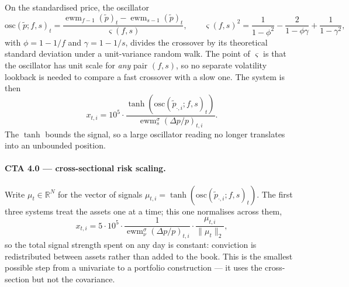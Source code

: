 \documentclass[11pt,a4paper]{article}
\DeclareMathOperator{\ewm}{ewm}
\begin{document}
On the standardised price, the oscillator
\begin{equation}
  \mathrm{osc}(\tilde p; f, s)_t =
  \frac{\ewm_{f-1}(\tilde p)_t - \ewm_{s-1}(\tilde p)_t}{\varsigma(f,s)},
  \qquad
  \varsigma(f,s)^2 = \frac{1}{1-\phi^2} - \frac{2}{1-\phi\gamma} + \frac{1}{1-\gamma^2},
  \label{eq:osc}
\end{equation}
with $\phi = 1 - 1/f$ and $\gamma = 1 - 1/s$, divides the crossover by its
theoretical standard deviation under a unit-variance random walk. The point of
$\varsigma$ is that the oscillator has unit scale for \emph{any} pair
$(f,s)$, so no separate volatility lookback is needed to compare a fast
crossover with a slow one. The system is then
\begin{equation}
  x_{t,i} = 10^{5} \cdot
  \frac{\tanh\!\left( \mathrm{osc}(\tilde p_{\cdot,i}; f, s)_t \right)}
       {\ewm^{\sigma}_{s}\!\left( \Delta p / p \right)_{t,i}} .
  \label{eq:cta3}
\end{equation}
The $\tanh$ bounds the signal, so a large oscillator reading no longer
translates into an unbounded position.

\paragraph{CTA 4.0 --- cross-sectional risk scaling.}
Write $\mu_{t} \in \mathbb{R}^{N}$ for the vector of signals
$\mu_{t,i} = \tanh(\mathrm{osc}(\tilde p_{\cdot,i}; f, s)_t)$. The first three
systems treat the assets one at a time; this one normalises across them,
\begin{equation}
  x_{t,i} = 5 \cdot 10^{5} \cdot
  \frac{1}{\ewm^{\sigma}_{\nu}(\Delta p / p)_{t,i}} \cdot
  \frac{\mu_{t,i}}{\lVert \mu_t \rVert_2},
  \label{eq:cta4}
\end{equation}
so the total signal strength spent on any day is constant: conviction is
redistributed between assets rather than added to the book. This is the
smallest possible step from a univariate to a portfolio construction --- it
uses the cross-section but not the covariance.
\end{document}
